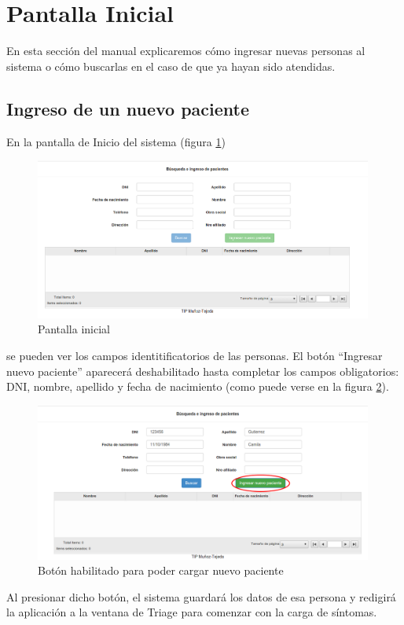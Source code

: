 \section{Pantalla Inicial}
En esta sección del manual explicaremos cómo ingresar nuevas personas al sistema o cómo buscarlas en el caso de que ya hayan sido atendidas.

\subsection{Ingreso de un nuevo paciente}
En la pantalla de Inicio del sistema (figura \ref{fig:inicio}) 
\begin{figure}
\centerline{\includegraphics[width=0.99\textwidth]{inicio.png}}
\caption{Pantalla inicial} \label{fig:inicio}
\end{figure}
se pueden ver los campos identitificatorios de las personas. El botón ``Ingresar nuevo paciente'' aparecerá deshabilitado hasta completar los campos obligatorios: DNI, nombre, apellido y fecha de nacimiento (como puede verse en la figura \ref{fig:inicio_nuevo}).
\begin{figure}
\centerline{\includegraphics[width=0.99\textwidth]{inicio_nuevo.png}}
\caption{Botón habilitado para poder cargar nuevo paciente} \label{fig:inicio_nuevo}
\end{figure}
Al presionar dicho botón, el sistema guardará los datos de esa persona y redigirá la aplicación a la ventana de Triage para comenzar con la carga de síntomas.

